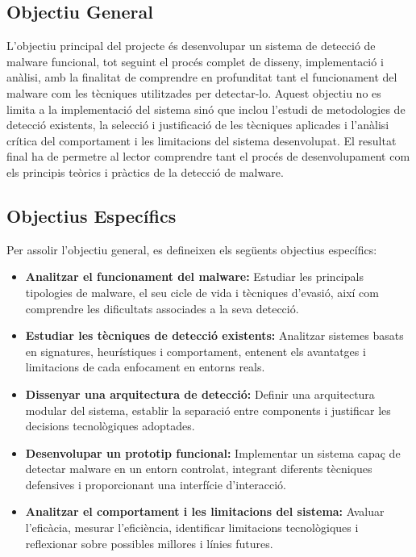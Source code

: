 \documentclass[12pt,a4paper]{report}
\begin{document}
\subsection{Objectiu General}
L'objectiu principal del projecte és desenvolupar un sistema de detecció de malware funcional, tot seguint el procés complet de disseny, implementació i anàlisi, amb la finalitat de comprendre en profunditat tant el funcionament del malware com les tècniques utilitzades per detectar-lo. Aquest objectiu no es limita a la implementació del sistema sinó que inclou l'estudi de metodologies de detecció existents, la selecció i justificació de les tècniques aplicades i l'anàlisi crítica del comportament i les limitacions del sistema desenvolupat. El resultat final ha de permetre al lector comprendre tant el procés de desenvolupament com els principis teòrics i pràctics de la detecció de malware.

\subsection{Objectius Específics}
Per assolir l'objectiu general, es defineixen els següents objectius específics:
\begin{itemize}
    \item \textbf{Analitzar el funcionament del malware:} Estudiar les principals tipologies de malware, el seu cicle de vida i tècniques d'evasió, així com comprendre les dificultats associades a la seva detecció.
    \item \textbf{Estudiar les tècniques de detecció existents:} Analitzar sistemes basats en signatures, heurístiques i comportament, entenent els avantatges i limitacions de cada enfocament en entorns reals.
    \item \textbf{Dissenyar una arquitectura de detecció:} Definir una arquitectura modular del sistema, establir la separació entre components i justificar les decisions tecnològiques adoptades.
    \item \textbf{Desenvolupar un prototip funcional:} Implementar un sistema capaç de detectar malware en un entorn controlat, integrant diferents tècniques defensives i proporcionant una interfície d'interacció.
    \item \textbf{Analitzar el comportament i les limitacions del sistema:} Avaluar l'eficàcia, mesurar l'eficiència, identificar limitacions tecnològiques i reflexionar sobre possibles millores i línies futures.
\end{itemize}
\end{document}
